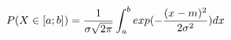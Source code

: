 \documentclass[preview]{standalone}
\begin{document}
\begin{align*}
P( X \in [a;b] ) = { \frac{1}{\sigma \sqrt{2\pi}} } \int_a^b { exp(-{  {(x - m)^2} \over {2 \sigma^2} }) } \space dx
\end{align*}
\end{document}
